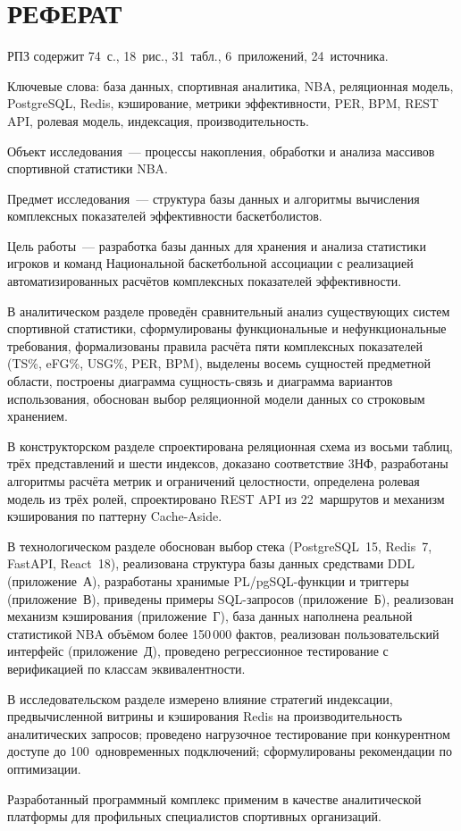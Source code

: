 \chapter*{РЕФЕРАТ}

РПЗ содержит 74~с., 18~рис., 31~табл., 6~приложений, 24~источника.

Ключевые слова: база данных, спортивная аналитика, NBA, реляционная
модель, \newline PostgreSQL, Redis, кэширование, метрики эффективности, PER, BPM,
REST API, ролевая модель, индексация, производительность.

Объект исследования~--- процессы накопления, обработки и анализа
массивов спортивной статистики NBA.

Предмет исследования~--- структура базы данных
и алгоритмы вычисления комплексных показателей эффективности баскетболистов.

Цель работы~--- разработка базы данных для хранения и анализа
статистики игроков и команд Национальной баскетбольной ассоциации
с реализацией автоматизированных расчётов комплексных показателей эффективности.

В аналитическом разделе проведён сравнительный анализ существующих систем
спортивной статистики, сформулированы функциональные и нефункциональные
требования, формализованы правила расчёта пяти комплексных показателей
(TS\%, eFG\%, USG\%, PER, BPM), выделены восемь сущностей предметной
области, построены диаграмма сущность-связь и диаграмма вариантов использования,
обоснован выбор реляционной модели данных со строковым хранением.

В конструкторском разделе спроектирована реляционная схема из восьми
таблиц, трёх представлений и шести индексов, доказано соответствие 3НФ,
разработаны алгоритмы расчёта метрик и ограничений целостности,
определена ролевая модель из трёх ролей,
спроектировано REST API из 22~маршрутов и механизм кэширования по паттерну Cache-Aside.

В технологическом разделе обоснован выбор стека (PostgreSQL~15, Redis~7,
FastAPI, React~18), реализована структура базы данных средствами DDL
(приложение~А),
разработаны хранимые PL/pgSQL-функции и триггеры (приложение~В),
приведены примеры SQL-запросов (приложение~Б), реализован механизм
кэширования (приложение~Г), база данных наполнена реальной статистикой NBA
объёмом более 150\,000 фактов, реализован пользовательский интерфейс
(приложение~Д), проведено регрессионное
тестирование с верификацией по классам эквивалентности.

В исследовательском разделе измерено влияние стратегий индексации,
предвычисленной витрины и кэширования Redis на производительность
аналитических запросов; проведено нагрузочное тестирование
при конкурентном доступе до 100~одновременных подключений;
сформулированы рекомендации по оптимизации.

Разработанный программный комплекс применим в качестве аналитической
платформы для профильных специалистов спортивных организаций.
